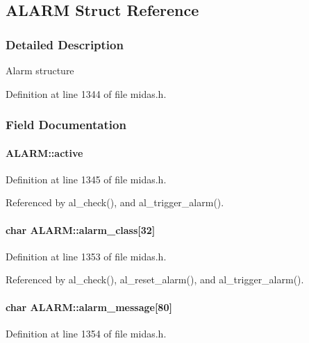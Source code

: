 \subsection{ALARM Struct Reference}
\label{structALARM}


\subsubsection{Detailed Description}
Alarm structure 

Definition at line 1344 of file midas.h.

\subsubsection{Field Documentation}
\paragraph[{active}]{ {\bf ALARM::active}}\hfill\label{structALARM_a74ffb34dd6b2f77dad4fbd364fe766a2}


Definition at line 1345 of file midas.h.

Referenced by al\_\-check(), and al\_\-trigger\_\-alarm().
\paragraph[{alarm\_\-class}]{\setlength{\rightskip}{0pt plus 5cm}char {\bf ALARM::alarm\_\-class}\mbox{[}32\mbox{]}}\hfill\label{structALARM_a0d3979e2fc61d91e50cde9992a6c6cbb}


Definition at line 1353 of file midas.h.

Referenced by al\_\-check(), al\_\-reset\_\-alarm(), and al\_\-trigger\_\-alarm().
\paragraph[{alarm\_\-message}]{\setlength{\rightskip}{0pt plus 5cm}char {\bf ALARM::alarm\_\-message}\mbox{[}80\mbox{]}}\hfill\label{structALARM_ac5eb00685c40af0065b7987d38815255}


Definition at line 1354 of file midas.h.

